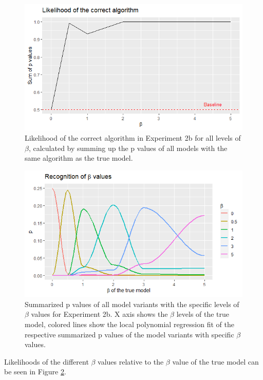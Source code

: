 \begin{figure}
	\centering
	\includegraphics[width=0.95\linewidth]{../../statistics/R_concave_beta_algosum}
	\caption{Likelihood of the correct algorithm in Experiment 2b for all levels of $\beta$, calculated by summing up the p values of all models with the same algorithm as the true model.}
	\label{fig:rbetaalgosum}
\end{figure}

\begin{figure}
	\centering
	\includegraphics[width=0.95\linewidth]{../../statistics/R_beta}
	\caption{Summarized p values of all model variants with the specific levels of $\beta$ values for Experiment 2b. X axis shows the $\beta$ levels of the true model, colored lines show the local polynomial regression fit of the respective summarized p values of the model variants with specific $\beta$ values.}
	\label{fig:rbeta}
\end{figure}

Likelihoods of the different $\beta$ values relative to the $\beta$ value of the true model can be seen in Figure \ref{fig:rbeta}.

